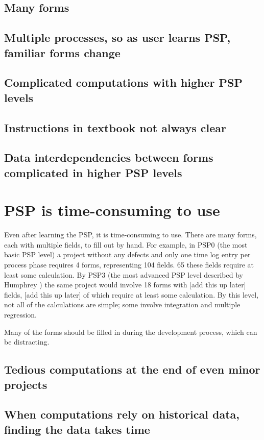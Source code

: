 \subsection{Many forms}
\subsection{Multiple processes, so as user learns PSP, familiar forms change}
\subsection{Complicated computations with higher PSP levels}
\subsection{Instructions in textbook not always clear}
\subsection{Data interdependencies between forms complicated in higher PSP levels}
\section{PSP is time-consuming to use}

Even after learning the PSP, it is time-consuming to use.  There are many
forms, each with multiple fields, to fill out by hand.  For example, in
PSP0 (the most basic PSP level) a project without any defects and only one
time log entry per process phase
requires 4 forms, representing 104 fields. 65 these fields require at least
some calculation.  By PSP3 (the most advanced PSP
level described by Humphrey \cite{Humphrey95}) the same project would
involve 18 forms with [add this up later] fields, [add this up later] of which require at least some
calculation.  By this level, not all of the calculations are simple; some
involve integration and multiple regression.  

Many of the forms should be filled in during the development process, which
can be distracting.
 
\subsection{Tedious computations at the end of even minor projects}
\subsection{When computations rely on historical data, finding the data takes time}
